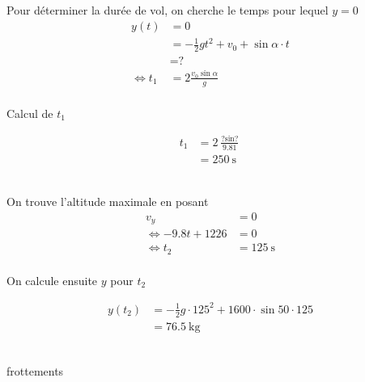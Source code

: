 \documentclass{article}
\begin{document}
\subsection{}

\section{}
\subsection{}
Pour déterminer la durée de vol, on cherche le temps pour lequel $y=0$
\begin{align*}
	y(t) &= 0 \\
             &=  -\frac{1}{2}gt^2+v_0+\sin\alpha \cdot t \\
	     &= \text{?} \\
	\iff t_1 &= 2\frac{v_0\sin\alpha}{g} \\
\end{align*}

Calcul de $t_1$ 

\begin{align*}
	t_1&= 2 \frac{\text{?}\sin\text{?}}{9.81} \\
	&= \SI{250}{\second} \\
\end{align*}

\subsection{}
On trouve l'altitude maximale en posant 
\begin{align*}
	v_y &= 0 \\
	\iff -9.8t + 1226 &= 0 \\
	\iff t_2 &= \SI{125}{\second} \\
\end{align*}

On calcule ensuite $y$ pour $t_2$ 

\begin{align*}
	y(t_2)&= -\frac{1}{2}g  \cdot 125^2 + 1600 \cdot \sin{50}  \cdot 125 \\
	&= \SI{76.5}{\kilo\gram} \\
\end{align*}

\subsection{}

frottements
\end{document}

